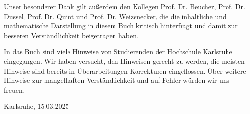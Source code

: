 Unser besonderer Dank gilt außerdem den Kollegen Prof. Dr. Beucher, Prof. Dr. Dussel, Prof. Dr. Quint und Prof. Dr. Weizenecker, die die inhaltliche und mathematische Darstellung in diesem Buch kritisch hinterfragt und damit zur besseren Verständlichkeit beigetragen haben.

In das Buch sind viele Hinweise von Studierenden der Hochschule Karlsruhe eingegangen. Wir haben versucht, den Hinweisen gerecht zu werden, die meisten Hinweise sind bereits in Überarbeitungen Korrekturen eingeflossen. Über weitere Hinweise zur mangelhaften Verständlichkeit und auf Fehler würden wir uns freuen.

Karlsruhe, 15.03.2025
